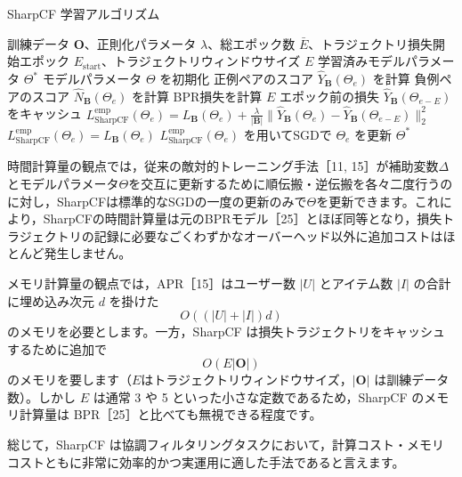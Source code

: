 \documentclass[11pt,a4paper]{article}
\begin{document}
\begin{algorithm}[ht]
    \caption{SharpCF 学習アルゴリズム}
    \label{alg:sharpcf}
    \begin{algorithmic}[1]
    \REQUIRE 訓練データ $\bm{O}$、正則化パラメータ $\lambda$、総エポック数 $\bar{E}$、トラジェクトリ損失開始エポック $E_{\text{start}}$、トラジェクトリウィンドウサイズ $E$
    \ENSURE 学習済みモデルパラメータ $\Theta^*$
    \STATE モデルパラメータ $\Theta$ を初期化
        \STATE 正例ペアのスコア $\hat{Y}_{\bm{B}}(\Theta_e)$ を計算
        \STATE 負例ペアのスコア $\hat{N}_{\bm{B}}(\Theta_e)$ を計算
        \STATE BPR損失を計算
        \STATE $E$ エポック前の損失 $\hat{Y}_{\bm{B}}(\Theta_{e-E})$ をキャッシュ
          \STATE $L_{\text{SharpCF}}^{\text{emp}}(\Theta_e) = L_{\bm{B}}(\Theta_e) + \frac{\lambda}{|\bm{B}|} \|\hat{Y}_{\bm{B}}(\Theta_e)-\hat{Y}_{\bm{B}}(\Theta_{e-E})\|_2^2$
        \ELSE
          \STATE $L_{\text{SharpCF}}^{\text{emp}}(\Theta_e) = L_{\bm{B}}(\Theta_e)$
        \ENDIF
        \STATE $L_{\text{SharpCF}}^{\text{emp}}(\Theta_e)$ を用いてSGDで $\Theta_e$ を更新
      \ENDFOR
    \ENDFOR
    \RETURN $\Theta^*$
    \end{algorithmic}
\end{algorithm}

時間計算量の観点では，従来の敵対的トレーニング手法［11, 15］が補助変数$\Delta$とモデルパラメータ$Θ$を交互に更新するために順伝搬・逆伝搬を各々二度行うのに対し，SharpCFは標準的なSGDの一度の更新のみで$Θ$を更新できます。これにより，SharpCFの時間計算量は元のBPRモデル［25］とほぼ同等となり，損失トラジェクトリの記録に必要なごくわずかなオーバーヘッド以外に追加コストはほとんど発生しません。

メモリ計算量の観点では，APR［15］はユーザー数 $|U|$ とアイテム数 $|I|$ の合計に埋め込み次元 $d$ を掛けた
\begin{equation}
O\left((|U| + |I|)d\right)
\end{equation}
のメモリを必要とします。一方，SharpCF は損失トラジェクトリをキャッシュするために追加で
\begin{equation}
O\left(E|\bm{O}|\right)
\end{equation}
のメモリを要します（$E$はトラジェクトリウィンドウサイズ，$|\bm{O}|$ は訓練データ数）。しかし $E$ は通常 3 や 5 といった小さな定数であるため，SharpCF のメモリ計算量は BPR［25］と比べても無視できる程度です。

総じて，SharpCF は協調フィルタリングタスクにおいて，計算コスト・メモリコストともに非常に効率的かつ実運用に適した手法であると言えます。
\end{document}
